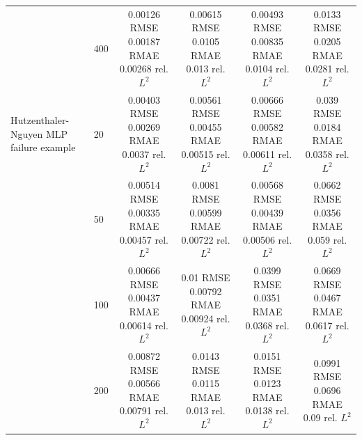\begin{tabular}{llcccc}
 & 400 & \shortstack{0.00126 RMSE\\0.00187 RMAE\\0.00268 rel. $L^2$} & \shortstack{0.00615 RMSE\\0.0105 RMAE\\0.013 rel. $L^2$} & \shortstack{0.00493 RMSE\\0.00835 RMAE\\0.0104 rel. $L^2$} & \shortstack{0.0133 RMSE\\0.0205 RMAE\\0.0281 rel. $L^2$} \\
\addlinespace
Hutzenthaler-Nguyen MLP failure example & 20 & \shortstack{0.00403 RMSE\\0.00269 RMAE\\0.0037 rel. $L^2$} & \shortstack{0.00561 RMSE\\0.00455 RMAE\\0.00515 rel. $L^2$} & \shortstack{0.00666 RMSE\\0.00582 RMAE\\0.00611 rel. $L^2$} & \shortstack{0.039 RMSE\\0.0184 RMAE\\0.0358 rel. $L^2$} \\
 & 50 & \shortstack{0.00514 RMSE\\0.00335 RMAE\\0.00457 rel. $L^2$} & \shortstack{0.0081 RMSE\\0.00599 RMAE\\0.00722 rel. $L^2$} & \shortstack{0.00568 RMSE\\0.00439 RMAE\\0.00506 rel. $L^2$} & \shortstack{0.0662 RMSE\\0.0356 RMAE\\0.059 rel. $L^2$} \\
 & 100 & \shortstack{0.00666 RMSE\\0.00437 RMAE\\0.00614 rel. $L^2$} & \shortstack{0.01 RMSE\\0.00792 RMAE\\0.00924 rel. $L^2$} & \shortstack{0.0399 RMSE\\0.0351 RMAE\\0.0368 rel. $L^2$} & \shortstack{0.0669 RMSE\\0.0467 RMAE\\0.0617 rel. $L^2$} \\
 & 200 & \shortstack{0.00872 RMSE\\0.00566 RMAE\\0.00791 rel. $L^2$} & \shortstack{0.0143 RMSE\\0.0115 RMAE\\0.013 rel. $L^2$} & \shortstack{0.0151 RMSE\\0.0123 RMAE\\0.0138 rel. $L^2$} & \shortstack{0.0991 RMSE\\0.0696 RMAE\\0.09 rel. $L^2$} \\

\end{tabular}
